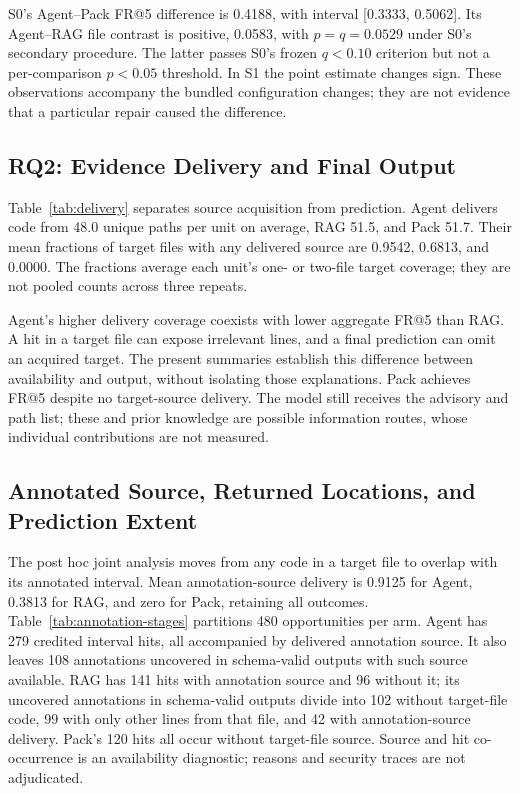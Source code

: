 S0's Agent--Pack FR@5 difference is 0.4188, with interval [0.3333, 0.5062]. Its Agent--RAG file contrast is positive, 0.0583, with $p=q=0.0529$ under S0's secondary procedure. The latter passes S0's frozen $q<0.10$ criterion but not a per-comparison $p<0.05$ threshold. In S1 the point estimate changes sign. These observations accompany the bundled configuration changes; they are not evidence that a particular repair caused the difference.

\subsection{RQ2: Evidence Delivery and Final Output}
Table~\ref{tab:delivery} separates source acquisition from prediction. Agent delivers code from 48.0 unique paths per unit on average, RAG 51.5, and Pack 51.7. Their mean fractions of target files with any delivered source are 0.9542, 0.6813, and 0.0000. The fractions average each unit's one- or two-file target coverage; they are not pooled counts across three repeats.


Agent's higher delivery coverage coexists with lower aggregate FR@5 than RAG. A hit in a target file can expose irrelevant lines, and a final prediction can omit an acquired target. The present summaries establish this difference between availability and output, without isolating those explanations. Pack achieves FR@5 \SOnePackFR{} despite no target-source delivery. The model still receives the advisory and path list; these and prior knowledge are possible information routes, whose individual contributions are not measured.

\subsection{Annotated Source, Returned Locations, and Prediction Extent}
The post hoc joint analysis moves from any code in a target file to overlap with its annotated interval. Mean annotation-source delivery is 0.9125 for Agent, 0.3813 for RAG, and zero for Pack, retaining all outcomes. Table~\ref{tab:annotation-stages} partitions 480 opportunities per arm. Agent has 279 credited interval hits, all accompanied by delivered annotation source. It also leaves 108 annotations uncovered in schema-valid outputs with such source available. RAG has 141 hits with annotation source and 96 without it; its uncovered annotations in schema-valid outputs divide into 102 without target-file code, 99 with only other lines from that file, and 42 with annotation-source delivery. Pack's 120 hits all occur without target-file source. Source and hit co-occurrence is an availability diagnostic; reasons and security traces are not adjudicated.



